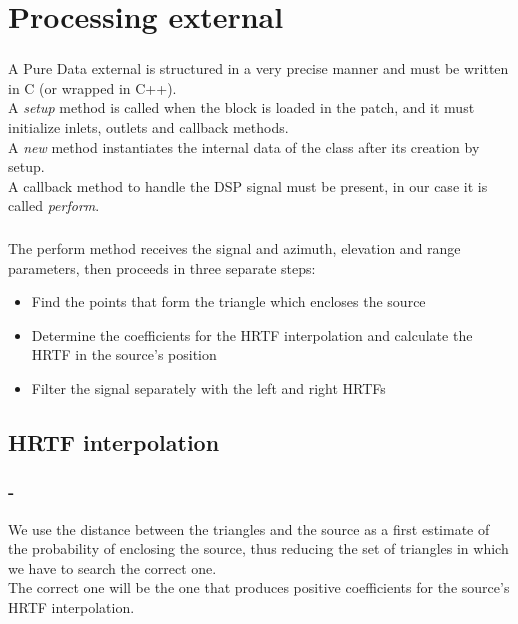 \documentclass{beamer}
\begin{document}
	\section{Processing external}

	\begin{frame}
		\frametitle{\insertsection}
		A Pure Data external is structured in a very precise manner and must be	written in C (or wrapped in C++).\\
		A {\em setup} method is called when the block is loaded in the patch, and it must initialize inlets,
		outlets and callback methods.\\
		A {\em new} method instantiates the internal data of the class after its creation by setup.\\
		A callback method to handle the DSP signal must be present, in our case it is called {\em perform}.\\
	\end{frame}

	\begin{frame}
		\frametitle{\insertsection}
		The perform method receives the signal and azimuth, elevation and range parameters,
		then proceeds in three separate steps:
		\begin{itemize}
			\item Find the points that form the triangle which encloses the source
			\item Determine the coefficients for the HRTF interpolation and calculate the HRTF in the source's
				position
			\item Filter the signal separately with the left and right HRTFs
		\end{itemize}
	\end{frame}

	\subsection{HRTF interpolation}

	\begin{frame}
		\frametitle{\insertsection - \insertsubsection}
		We use the distance between the triangles and the source as a first estimate of the probability of enclosing
		the source, thus reducing the set of triangles in which we have to search the correct one.\\
		The correct one will be the one that produces positive coefficients for the source's HRTF interpolation.\\
	\end{frame}
\end{document}
